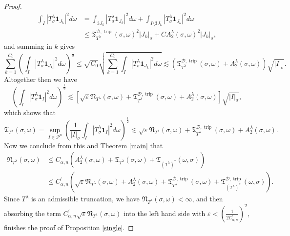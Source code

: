 \documentclass{amsart}%
\theoremstyle{plain}
\numberwithin{equation}{section}
\begin{document}
\begin{proof}
\begin{align*}
\int_{I}\left\vert T_{\sigma}^{\lambda}\mathbf{1}_{J_{k}}\right\vert
^{2}d\omega &  =\int_{3J_{k}}\left\vert T_{\sigma}^{\lambda}\mathbf{1}_{J_{k}%
}\right\vert ^{2}d\omega+\int_{I\setminus3J_{k}}\left\vert T_{\sigma}%
^{\lambda}\mathbf{1}_{J_{k}}\right\vert ^{2}d\omega\\
&  \leq\mathfrak{T}_{T^{\lambda}}^{\mathcal{D},\operatorname*{trip}}\left(
\sigma,\omega\right)  ^{2}\left\vert J_{k}\right\vert _{\sigma}+CA_{2}%
^{\lambda}\left(  \sigma,\omega\right)  ^{2}\left\vert J_{k}\right\vert
_{\sigma},
\end{align*}
and summing in $k$ gives%
\[
\sum_{k=1}^{C_{0}}\left(  \int_{I}\left\vert T_{\sigma}^{\lambda}%
\mathbf{1}_{J_{k}}\right\vert ^{2}d\omega\right)  ^{\frac{1}{2}}\leq
\sqrt{C_{0}}\sqrt{\sum_{k=1}^{C_{0}}\int_{I}\left\vert T_{\sigma}^{\lambda
}\mathbf{1}_{J_{k}}\right\vert ^{2}d\omega}\lesssim\left(  \mathfrak{T}%
_{T^{\lambda}}^{\mathcal{D},\operatorname*{trip}}\left(  \sigma,\omega\right)
+A_{2}^{\lambda}\left(  \sigma,\omega\right)  \right)  \sqrt{\left\vert
I\right\vert _{\sigma}}.
\]
Altogether then we have%
\[
\left(  \int_{I}\left\vert T_{\sigma}^{\lambda}\mathbf{1}_{I}\right\vert
^{2}d\omega\right)  ^{\frac{1}{2}}\lesssim\left[  \sqrt{\varepsilon
}\mathfrak{N}_{T^{\lambda}}\left(  \sigma,\omega\right)  +\mathfrak{T}%
_{T^{\lambda}}^{\mathcal{D},\operatorname*{trip}}\left(  \sigma,\omega\right)
+A_{2}^{\lambda}\left(  \sigma,\omega\right)  \right]  \sqrt{\left\vert
I\right\vert _{\sigma}},
\]
which shows that%
\[
\mathfrak{T}_{T^{\lambda}}\left(  \sigma,\omega\right)  =\sup_{I\in
\mathcal{P}^{n}}\left(  \frac{1}{\left\vert I\right\vert _{\sigma}}\int
_{I}\left\vert T_{\sigma}^{\lambda}\mathbf{1}_{I}\right\vert ^{2}%
d\omega\right)  ^{\frac{1}{2}}\lesssim\sqrt{\varepsilon}\mathfrak{N}%
_{T^{\lambda}}\left(  \sigma,\omega\right)  +\mathfrak{T}_{T^{\lambda}%
}^{\mathcal{D},\operatorname*{trip}}\left(  \sigma,\omega\right)
+A_{2}^{\lambda}\left(  \sigma,\omega\right)  .
\]
Now we conclude from this and Theorem \ref{main} that
\begin{align*}
\mathfrak{N}_{T^{\lambda}}\left(  \sigma,\omega\right)   &  \leq C_{\alpha
,n}\left(  A_{2}^{\lambda}\left(  \sigma,\omega\right)  +\mathfrak{T}%
_{T^{\lambda}}\left(  \sigma,\omega\right)  +\mathfrak{T}_{\left(  T^{\lambda
}\right)  ^{\ast}}\left(  \omega,\sigma\right)  \right) \\
&  \leq C_{\alpha,n}^{\prime}\left(  \sqrt{\varepsilon}\mathfrak{N}%
_{T^{\lambda}}\left(  \sigma,\omega\right)  +A_{2}^{\lambda}\left(
\sigma,\omega\right)  +\mathfrak{T}_{T^{\lambda}}^{\mathcal{D}%
,\operatorname*{trip}}\left(  \sigma,\omega\right)  +\mathfrak{T}_{\left(
T^{\lambda}\right)  ^{\ast}}^{\mathcal{D},\operatorname*{trip}}\left(
\omega,\sigma\right)  \right)  .
\end{align*}
Since $T^{\lambda}$ is an admissible truncation, we have $\mathfrak{N}%
_{T^{\lambda}}\left(  \sigma,\omega\right)  <\infty$, and then absorbing the
term $C_{\alpha,n}^{\prime}\sqrt{\varepsilon}\mathfrak{N}_{T^{\lambda}}\left(
\sigma,\omega\right)  $ into the left hand side with $\varepsilon<\left(
\frac{1}{2C_{\alpha,n}^{\prime}}\right)  ^{2}$, finishes the proof of
Proposition \ref{single}.
\end{proof}
\end{document}
